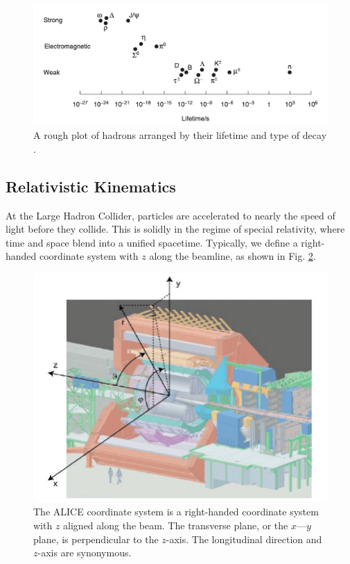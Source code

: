 \documentclass[../main.tex]{subfiles}
\begin{document}
\begin{figure}[h]
    \centering
    \includegraphics[scale=0.3]{introduction/figs/lifetimes.png}
    \caption{A rough plot of hadrons arranged by their lifetime and type of decay \cite{Thomson:particle}.}
    \label{fig:lifetimes}
\end{figure}

\subsection{Relativistic Kinematics}
At the Large Hadron Collider, particles are accelerated to nearly the speed of light before they collide. This is solidly in the regime of special relativity, where time and space blend into a unified spacetime. Typically, we define a right-handed coordinate system with $z$ along the beamline, as shown in Fig. \ref{fig:alice_coords}. 

\begin{figure}[h]
    \centering
    \includegraphics[scale=0.3]{introduction/figs/alice_coords.png}
    \caption{The ALICE coordinate system is a right-handed coordinate system with $z$ aligned along the beam. The transverse plane, or the $x$---$y$ plane, is perpendicular to the $z$-axis. The longitudinal direction and $z$-axis are synonymous.}
    \label{fig:alice_coords}
\end{figure}
\end{document}
